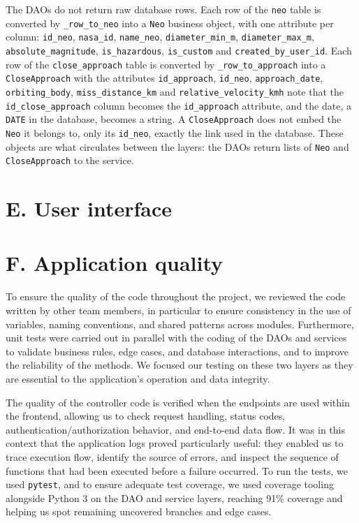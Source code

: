 \documentclass[
  french,
  11pt,
  a4paper,
]{report}
\begin{document}
The DAOs do not return raw database rows. Each row of the \texttt{neo}
table is converted by \texttt{\_row\_to\_neo} into a \texttt{Neo}
business object, with one attribute per column: \texttt{id\_neo},
\texttt{nasa\_id}, \texttt{name\_neo}, \texttt{diameter\_min\_m},
\texttt{diameter\_max\_m}, \texttt{absolute\_magnitude},
\texttt{is\_hazardous}, \texttt{is\_custom} and
\texttt{created\_by\_user\_id}. Each row of the \texttt{close\_approach}
table is converted by \texttt{\_row\_to\_approach} into a
\texttt{CloseApproach} with the attributes \texttt{id\_approach},
\texttt{id\_neo}, \texttt{approach\_date}, \texttt{orbiting\_body},
\texttt{miss\_distance\_km} and \texttt{relative\_velocity\_kmh} note
that the \texttt{id\_close\_approach} column becomes the
\texttt{id\_approach} attribute, and the date, a \texttt{DATE} in the
database, becomes a string. A \texttt{CloseApproach} does not embed the
\texttt{Neo} it belongs to, only its \texttt{id\_neo}, exactly the link
used in the database. These objects are what circulates between the
layers: the DAOs return lists of \texttt{Neo} and \texttt{CloseApproach}
to the service.

\section{E. User interface}\label{e.-user-interface}

\section{F. Application quality}\label{f.-application-quality}

To ensure the quality of the code throughout the project, we reviewed
the code written by other team members, in particular to ensure
consistency in the use of variables, naming conventions, and shared
patterns across modules. Furthermore, unit tests were carried out in
parallel with the coding of the DAOs and services to validate business
rules, edge cases, and database interactions, and to improve the
reliability of the methods. We focused our testing on these two layers
as they are essential to the application's operation and data integrity.

The quality of the controller code is verified when the endpoints are
used within the frontend, allowing us to check request handling, status
codes, authentication/authorization behavior, and end-to-end data flow.
It was in this context that the application logs proved particularly
useful: they enabled us to trace execution flow, identify the source of
errors, and inspect the sequence of functions that had been executed
before a failure occurred. To run the tests, we used \texttt{pytest},
and to ensure adequate test coverage, we used coverage tooling alongside
Python 3 on the DAO and service layers, reaching 91\% coverage and
helping us spot remaining uncovered branches and edge cases.
\end{document}
